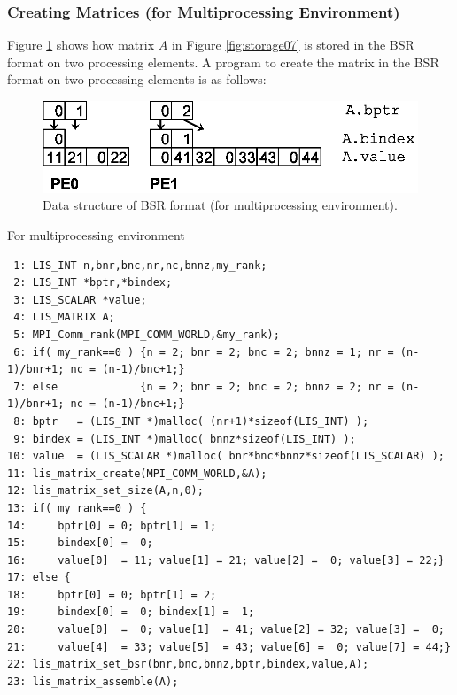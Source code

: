\documentclass[a4paper]{article}
\begin{document}
\newpage
\subsubsection{Creating Matrices (for Multiprocessing Environment)}
Figure \ref{fig:storage07_mpi} shows how matrix $A$ in Figure \ref{fig:storage07} is stored in the BSR format on two processing elements. A program to create the matrix in the BSR format on two processing elements is as follows:
\begin{figure}[h]
{\centering 
\includegraphics{storage07_mpi.eps} 
\caption{Data structure of BSR format (for multiprocessing environment).}\label{fig:storage07_mpi}}
\end{figure}
\begin{itemsquarebox}[l]{For multiprocessing environment}
\small
\begin{verbatim}
 1: LIS_INT n,bnr,bnc,nr,nc,bnnz,my_rank;
 2: LIS_INT *bptr,*bindex;
 3: LIS_SCALAR *value;
 4: LIS_MATRIX A;
 5: MPI_Comm_rank(MPI_COMM_WORLD,&my_rank);
 6: if( my_rank==0 ) {n = 2; bnr = 2; bnc = 2; bnnz = 1; nr = (n-1)/bnr+1; nc = (n-1)/bnc+1;}
 7: else             {n = 2; bnr = 2; bnc = 2; bnnz = 2; nr = (n-1)/bnr+1; nc = (n-1)/bnc+1;}
 8: bptr   = (LIS_INT *)malloc( (nr+1)*sizeof(LIS_INT) );
 9: bindex = (LIS_INT *)malloc( bnnz*sizeof(LIS_INT) );
10: value  = (LIS_SCALAR *)malloc( bnr*bnc*bnnz*sizeof(LIS_SCALAR) );
11: lis_matrix_create(MPI_COMM_WORLD,&A);
12: lis_matrix_set_size(A,n,0);
13: if( my_rank==0 ) {
14:     bptr[0] = 0; bptr[1] = 1;
15:     bindex[0] =  0;
16:     value[0]  = 11; value[1] = 21; value[2] =  0; value[3] = 22;}
17: else {
18:     bptr[0] = 0; bptr[1] = 2;
19:     bindex[0] =  0; bindex[1] =  1;
20:     value[0]  =  0; value[1]  = 41; value[2] = 32; value[3] =  0;
21:     value[4]  = 33; value[5]  = 43; value[6] =  0; value[7] = 44;}
22: lis_matrix_set_bsr(bnr,bnc,bnnz,bptr,bindex,value,A);
23: lis_matrix_assemble(A);
\end{verbatim}
\end{itemsquarebox}
\end{document}
